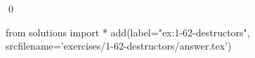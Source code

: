 
\begin{ex}
  \label{ex:1-62-destructors}
  
  \qed
\end{ex}
\begin{python0}
from solutions import *
add(label="ex:1-62-destructors",
    srcfilename='exercises/1-62-destructors/answer.tex')
\end{python0}
